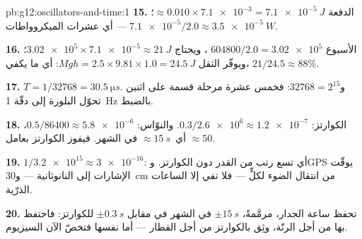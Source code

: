\begin{solution}{pb:g12:oscillators-and-time:1}
\textbf{15.} الدفعة $\approx 0.010 \times \num{7.1e-3} =
\qty{7.1e-5}{J}$؛  $\num{7.1e-5}/2.0 \approx \qty{3.5e-5}{W}$
--- أي عشرات الميكروواطات.

\textbf{16.} الأسبوع $604800/2.0 = \num{3.02e5}$ ، ويحتاج
$\num{3.02e5} \times \num{7.1e-5} \approx \qty{21}{J}$؛ ويوفّر الثقل
$Mgh = 2.5 \times 9.81 \times 1.0 = \qty{24.5}{J}$: أي ما يكفي،
 $21/24.5 \approx 88\%$.

\textbf{17.} $T = 1/\num{32768} = \qty{30.5}{\micro s}$. و$\num{32768}
= 2^{15}$: فخمس عشرة مرحلة قسمة على اثنين تحوّل  البلورة
إلى دقّة \qty{1}{Hz} بالضبط.

\textbf{18.} الكوارتز: $0.3/\num{2.6e6} \approx \num{1.2e-7}$.
والنوّاس: $0.5/86400 \approx \num{5.8e-6}$، أي\ $\approx
\qty{15}{s}$ في الشهر. فيفوز الكوارتز بعامل $\approx 50$.

\textbf{19.} $1/\num{3.2e15} \approx \num{3e-16}$: أي تسع رتب من
القدر دون الكوارتز. وGPS يوقّت الإشارات إلى النانوثانية ---
و\qty{30}{cm} من انتقال الضوء لكلٍّ --- فلا تفي إلا الساعات الذرّية.

\textbf{20.} تحفظ ساعة الجدار، مرمَّمةً، $\pm\qty{15}{s}$ في
الشهر في مقابل $\pm\qty{0.3}{s}$ للكوارتز: فاحتفظ بها من أجل الرنّة،
وثِق بالكوارتز من أجل القطار --- أما  نفسها فتخصّ الآن
 السيزيوم.
\end{solution}
